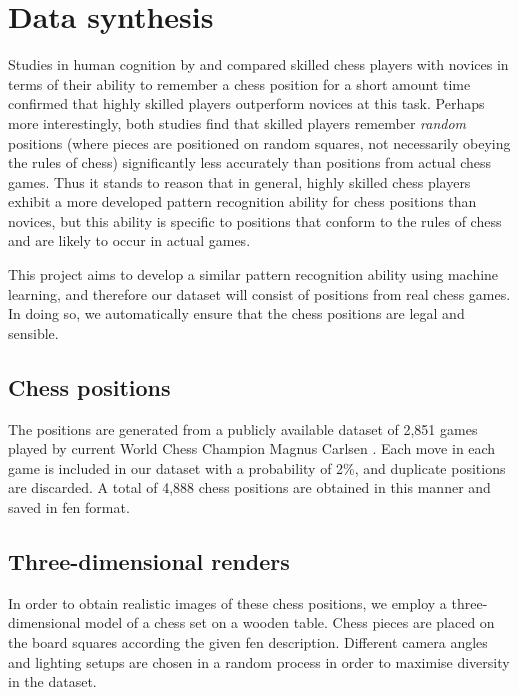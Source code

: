\documentclass[../main.tex]{subfiles}
\begin{document}
\chapter{Data synthesis}
\label{chap:data_synthesis}

Studies in human cognition by \textcite{bilalic2010} and \textcite{zhou2018} compared skilled chess players with novices in terms of their ability to remember a chess position for a short amount time confirmed that highly skilled players outperform novices at this task.
Perhaps more interestingly, both studies find that skilled players remember \emph{random} positions (where pieces are positioned on random squares, not necessarily obeying the rules of chess) significantly less accurately than positions from actual chess games. 
Thus it stands to reason that in general, highly skilled chess players exhibit a more developed pattern recognition ability for chess positions than novices, but this ability is specific to positions that conform to the rules of chess and are likely to occur in actual games.

This project aims to develop a similar pattern recognition ability using machine learning, and therefore our dataset will consist of positions from real chess games. 
In doing so, we automatically ensure that the chess positions are legal and sensible.

\section{Chess positions}
\label{sec:data_chess_positions}
The positions are generated from a publicly available dataset of 2,851 games played by current World Chess Champion Magnus Carlsen \cite{64squares2020}.
Each move in each game is included in our dataset with a probability of 2\%, and duplicate positions are discarded.
A total of 4,888 chess positions are obtained in this manner and saved in \gls{fen} format.

\section{Three-dimensional renders}
In order to obtain realistic images of these chess positions, we employ a three-dimensional model of a chess set on a wooden table. 
Chess pieces are placed on the board squares according the given \gls{fen} description. 
Different camera angles and lighting setups are chosen in a random process in order to maximise diversity in the dataset.
\end{document}
